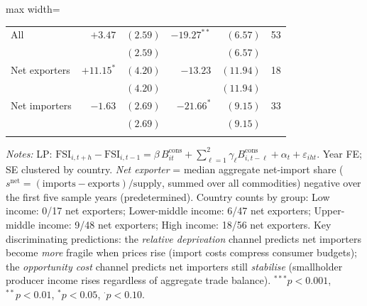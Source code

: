 \begin{table}[htbp]
\begin{adjustbox}{max width=\textwidth}
\begin{threeparttable}
\begin{tabular}{l rr rr r}
\quad All & $+3.47$ & $(2.59)$ & $-19.27^{**}$ & $(6.57)$ & 53 \\
 & & $(2.59)$ & & $(6.57)$ & \\
\quad Net exporters & $+11.15^{*}$ & $(4.20)$ & $-13.23$ & $(11.94)$ & 18 \\
 & & $(4.20)$ & & $(11.94)$ & \\
\quad Net importers & $-1.63$ & $(2.69)$ & $-21.66^{*}$ & $(9.15)$ & 33 \\
 & & $(2.69)$ & & $(9.15)$ & \\
\addlinespace
\bottomrule
\end{tabular}
\begin{tablenotes}\small
\item \textit{Notes:} LP: $\text{FSI}_{i,t+h} - \text{FSI}_{i,t-1} = \beta\,B^{\text{cons}}_{it} + \sum_{\ell=1}^{2}\gamma_\ell B^{\text{cons}}_{i,t-\ell} + \alpha_t + \varepsilon_{iht}$. Year FE; SE clustered by country. \textit{Net exporter} = median aggregate net-import share ($s^{\text{net}} = (\text{imports} - \text{exports})/\text{supply}$, summed over all commodities) negative over the first five sample years (predetermined). Country counts by group: Low income: 0/17 net exporters; Lower-middle income: 6/47 net exporters; Upper-middle income: 9/48 net exporters; High income: 18/56 net exporters. Key discriminating predictions: the \textit{relative deprivation} channel predicts net importers become \textit{more} fragile when prices rise (import costs compress consumer budgets); the \textit{opportunity cost} channel predicts net importers still \textit{stabilise} (smallholder producer income rises regardless of aggregate trade balance). $^{***}p<0.001$, $^{**}p<0.01$, $^{*}p<0.05$, $^{\cdot}p<0.10$.
\end{tablenotes}
\end{threeparttable}
\end{adjustbox}
\end{table}

